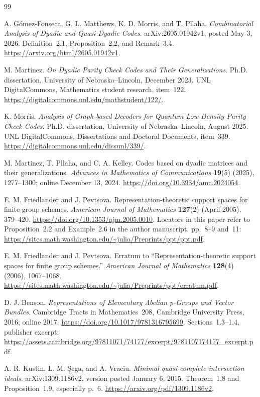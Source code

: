\documentclass[11pt]{article}
\theoremstyle{definition}
\begin{document}
\begin{thebibliography}{99}
\raggedright
{} A. G\'omez-Fonseca, G. L. Matthews, K. D. Morris, and T. Pllaha.
\emph{Combinatorial Analysis of Dyadic and Quasi-Dyadic Codes}.
arXiv:2605.01942v1, posted May 3, 2026. Definition~2.1, Proposition~2.2, and Remark~3.4.
\url{https://arxiv.org/html/2605.01942v1}.

 M. Martinez.
\emph{On Dyadic Parity Check Codes and Their Generalizations}.
Ph.D. dissertation, University of Nebraska--Lincoln, December 2023.
UNL DigitalCommons, Mathematics student research, item~122.
\url{https://digitalcommons.unl.edu/mathstudent/122/}.

 K. Morris.
\emph{Analysis of Graph-based Decoders for Quantum Low Density Parity Check Codes}.
Ph.D. dissertation, University of Nebraska--Lincoln, August 2025.
UNL DigitalCommons, Dissertations and Doctoral Documents, item~339.
\url{https://digitalcommons.unl.edu/dissunl/339/}.

 M. Martinez, T. Pllaha, and C. A. Kelley.
Codes based on dyadic matrices and their generalizations.
\emph{Advances in Mathematics of Communications} \textbf{19}(5) (2025), 1277--1300; online December 13, 2024.
\url{https://doi.org/10.3934/amc.2024054}.

 E. M. Friedlander and J. Pevtsova.
Representation-theoretic support spaces for finite group schemes.
\emph{American Journal of Mathematics} \textbf{127}(2) (April 2005), 379--420.
\url{https://doi.org/10.1353/ajm.2005.0010}.
Locators in this paper refer to Proposition~2.2 and Example~2.6 in the author manuscript, pp.~8--9 and~11:
\url{https://sites.math.washington.edu/~julia/Preprints/ppt/ppt.pdf}.

 E. M. Friedlander and J. Pevtsova.
Erratum to ``Representation-theoretic support spaces for finite group schemes.''
\emph{American Journal of Mathematics} \textbf{128}(4) (2006), 1067--1068.
\url{https://sites.math.washington.edu/~julia/Preprints/ppt/erratum.pdf}.

 D. J. Benson.
\emph{Representations of Elementary Abelian p-Groups and Vector Bundles}.
Cambridge Tracts in Mathematics~208, Cambridge University Press, 2016; online 2017.
\url{https://doi.org/10.1017/9781316795699}.
Sections~1.3--1.4, publisher excerpt:
\url{https://assets.cambridge.org/97811071/74177/excerpt/9781107174177_excerpt.pdf}.

 A. R. Kustin, L. M. \c{S}ega, and A. Vraciu.
\emph{Minimal quasi-complete intersection ideals}.
arXiv:1309.1186v2, version posted January 6, 2015.
Theorem~1.8 and Proposition~1.9, especially p.~6.
\url{https://arxiv.org/pdf/1309.1186v2}.


\end{thebibliography}
\end{document}
